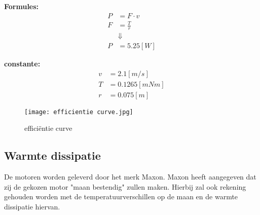 \begin{multicols}{2}
        \textbf{Formules:}
        \begin{equation}
            \begin{split}
                P &= F \cdot v \\
                F &= \frac{T}{r} \\
                &\Downarrow \\
                P &= 5.25 [W]
            \end{split}
        \end{equation}

        \textbf{constante:}
        \begin{equation*}
            \begin{split}
                v &= 2.1 [m/s] \\
                T &= 0.1265[mNm]  \\
                r &= 0.075[m]
            \end{split}
        \end{equation*}
    \end{multicols}


\begin{figure}[H]
    \centering
    \texttt{[image: efficientie curve.jpg]}
    \caption{efficiëntie curve}
    \label{fig:efficientie curve}
\end{figure}

\subsection{Warmte dissipatie}

De motoren worden geleverd door het merk Maxon. Maxon heeft aangegeven dat zij de gekozen motor "maan bestendig" zullen maken. Hierbij zal ook rekening gehouden worden met de temperatuurverschillen op de maan en de warmte dissipatie hiervan. 